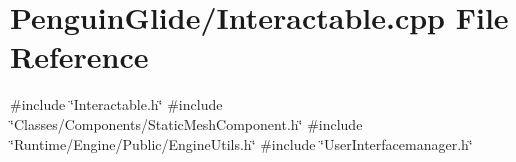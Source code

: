 \section{Penguin\+Glide/\+Interactable.cpp File Reference}
\label{_interactable_8cpp}
{\ttfamily \#include \char`\"{}Interactable.\+h\char`\"{}}\newline
{\ttfamily \#include \char`\"{}Classes/\+Components/\+Static\+Mesh\+Component.\+h\char`\"{}}\newline
{\ttfamily \#include \char`\"{}Runtime/\+Engine/\+Public/\+Engine\+Utils.\+h\char`\"{}}\newline
{\ttfamily \#include \char`\"{}User\+Interfacemanager.\+h\char`\"{}}\newline
